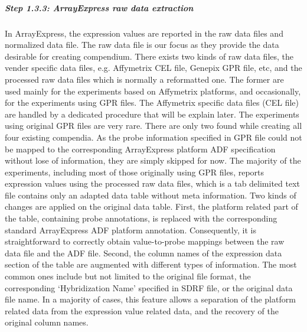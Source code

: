    \subparagraph{Step 1.3.3: ArrayExpress raw data extraction}

In ArrayExpress, the expression values are reported in the raw data files and normalized data file. The raw data file is our focus as they provide the data desirable for creating compendium. There exists two kinds of raw data files, the vender specific data files, e.g. Affymetrix CEL file, Genepix GPR file, etc, and the processed raw data files which is normally a reformatted one. The former are used mainly for the experiments based on Affymetrix platforms, and occasionally, for the experiments using GPR files. The Affymetrix specific data files (CEL file) are handled by a dedicated procedure that will be explain later. The experiments using original GPR files are very rare.  There are only two found while creating all four existing compendia.  As the probe information specified in GPR file could not be mapped to the corresponding ArrayExpress platform ADF specification without lose of information, they are simply skipped for now. The majority of the experiments, including most of those originally using GPR files, reports expression values using the processed raw data files, which is a tab delimited text file contains only an adapted data table without meta information. Two kinds of changes are applied on the original data table.  First, the platform related part of the table, containing probe annotations, is replaced with the corresponding standard ArrayExpress ADF platform annotation. Consequently, it is straightforward to correctly obtain value-to-probe mappings between the raw data file and the ADF file. Second, the column names of the expression data section of the table are augmented with different types of information.  The most common ones include but not limited to the original file format, the corresponding `Hybridization Name' specified in SDRF file, or the original data file name. In a majority of cases, this feature allows a separation of the platform related data from the expression value related data, and the recovery of the original column names.
 
